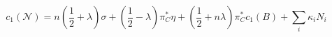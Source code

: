 \begin{equation}
c_{1}(\mathcal{N}) = n \left( \frac{1}{2} + \lambda \right) \sigma
   + \left( \frac{1}{2} - \lambda \right) \pi^{*}_{C} \eta 
   + \left( \frac{1}{2} + n \lambda \right) \pi^{*}_{C} c_{1}(B)
   + \textstyle{\sum_{i}} \kappa_{i} N_{i}
\end{equation}

